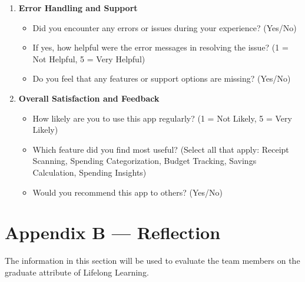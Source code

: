 \documentclass[12pt, titlepage]{article}
\begin{document}
\begin{enumerate}
    \item \textbf{Error Handling and Support}
    \begin{itemize}
        \item Did you encounter any errors or issues during your experience? (Yes/No)
        \item If yes, how helpful were the error messages in resolving the issue? (1 = Not Helpful, 5 = Very Helpful)
        \item Do you feel that any features or support options are missing? (Yes/No)
    \end{itemize}
    
    \item \textbf{Overall Satisfaction and Feedback}
    \begin{itemize}
        \item How likely are you to use this app regularly? (1 = Not Likely, 5 = Very Likely)
        \item Which feature did you find most useful? (Select all that apply: Receipt Scanning, Spending Categorization, Budget Tracking, Savings Calculation, Spending Insights)
        \item Would you recommend this app to others? (Yes/No)
    \end{itemize}
\end{enumerate}

\newpage{}
\section*{Appendix B --- Reflection}

The information in this section will be used to evaluate the team members on the
graduate attribute of Lifelong Learning.
\end{document}
